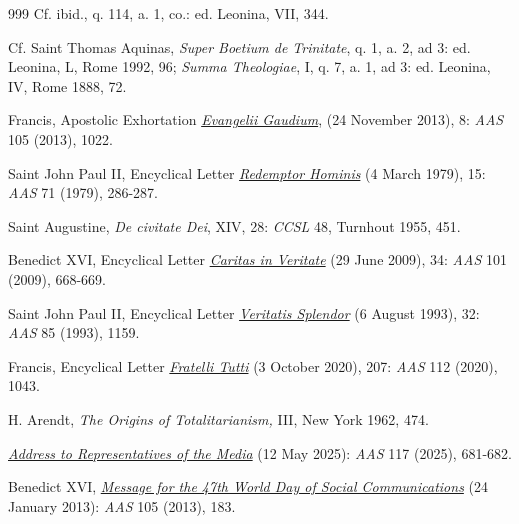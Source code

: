 \documentclass{article}
\begin{document}
\begin{thebibliography}{999}
 Cf. ibid., q. 114, a. 1, co.: ed. Leonina, VII, 344.

 Cf. Saint Thomas Aquinas, \emph{Super Boetium de Trinitate}, q. 1, a. 2, ad 3: ed. Leonina, L, Rome 1992, 96; \emph{Summa Theologiae}, I, q. 7, a. 1, ad 3: ed. Leonina, IV, Rome 1888, 72.

 Francis, Apostolic Exhortation \href{https://www.vatican.va/content/francesco/en/apost_exhortations/documents/papa-francesco_esortazione-ap_20131124_evangelii-gaudium.html}{\emph{Evangelii Gaudium}}, (24 November 2013), 8: \emph{AAS} 105 (2013), 1022.

 Saint John Paul II, Encyclical Letter \href{https://www.vatican.va/content/john-paul-ii/en/encyclicals/documents/hf_jp-ii_enc_04031979_redemptor-hominis.html}{\emph{Redemptor Hominis}} (4 March 1979), 15: \emph{AAS} 71 (1979), 286-287.

 Saint Augustine, \emph{De civitate Dei}, XIV, 28: \emph{CCSL} 48, Turnhout 1955, 451.

 Benedict XVI, Encyclical Letter \href{https://www.vatican.va/content/benedict-xvi/en/encyclicals/documents/hf_ben-xvi_enc_20090629_caritas-in-veritate.html}{\emph{Caritas in Veritate}} (29 June 2009), 34: \emph{AAS} 101 (2009), 668-669.

 Saint John Paul II, Encyclical Letter \href{https://www.vatican.va/content/john-paul-ii/en/encyclicals/documents/hf_jp-ii_enc_06081993_veritatis-splendor.html}{\emph{Veritatis Splendor}} (6 August 1993), 32: \emph{AAS} 85 (1993), 1159.

 Francis, Encyclical Letter \href{https://www.vatican.va/content/francesco/en/encyclicals/documents/papa-francesco_20201003_enciclica-fratelli-tutti.html}{\emph{Fratelli Tutti}} (3 October 2020), 207: \emph{AAS} 112 (2020), 1043.

 H. Arendt, \emph{The Origins of Totalitarianism,} III, New York 1962, 474.

 \href{https://www.vatican.va/content/leo-xiv/en/speeches/2025/may/documents/20250512-media.html}{\emph{Address to Representatives of the Media}} (12 May 2025): \emph{AAS} 117 (2025), 681-682.

 Benedict XVI, \href{https://www.vatican.va/content/benedict-xvi/en/messages/communications/documents/hf_ben-xvi_mes_20130124_47th-world-communications-day.html}{\emph{Message for the 47th World Day of Social Communications}} (24 January 2013): \emph{AAS} 105 (2013), 183.


\end{thebibliography}
\end{document}

